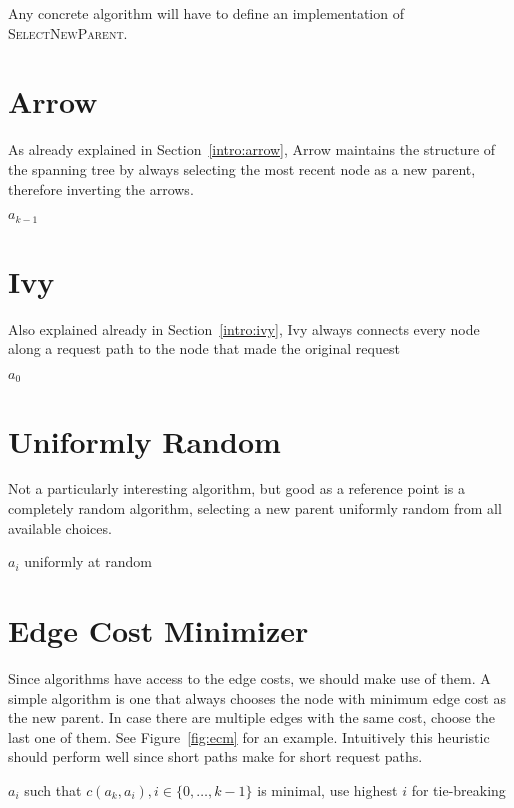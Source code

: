 \documentclass[a4paper, oneside]{discothesis}
\begin{document}
Any concrete algorithm will have to define an implementation of \textsc{SelectNewParent}.

\section{Arrow}

As already explained in Section~\ref{intro:arrow}, Arrow maintains the structure of the spanning tree by always selecting the most recent node as a new parent, therefore inverting the arrows.
\begin{algorithmic}
\State\Return $a_{k-1}$
\EndFunction
\end{algorithmic}

\section{Ivy}

Also explained already in Section~\ref{intro:ivy}, Ivy always connects every node along a request path to the node that made the original request
\begin{algorithmic}
\State\Return $a_0$
\EndFunction
\end{algorithmic}


\section{Uniformly Random}

Not a particularly interesting algorithm, but good as a reference point is a completely random algorithm, selecting a new parent uniformly random from all available choices.

\begin{algorithmic}
\State\Return $a_i$ uniformly at random
\EndFunction
\end{algorithmic}

\section{Edge Cost Minimizer}
\label{alg:ecm}

Since algorithms have access to the edge costs, we should make use of them. A simple algorithm is one that always chooses the node with minimum edge cost as the new parent. In case there are multiple edges with the same cost, choose the last one of them. See Figure~\ref{fig:ecm} for an example. Intuitively this heuristic should perform well since short paths make for short request paths.
\begin{algorithmic}
\State\Return$a_{i}$ such that $c(a_{k},a_{i}),i\in\{0,\dots,k-1\}$ is minimal, use highest $i$ for tie-breaking
\EndFunction
\end{algorithmic}
\end{document}
